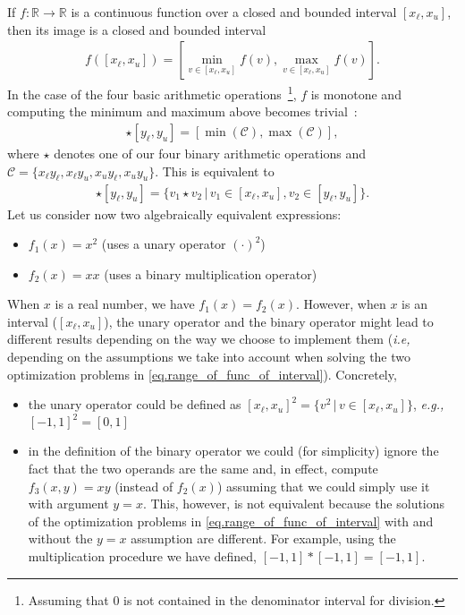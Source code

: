 \documentclass[12pt,a4paper]{article}
\begin{document}
If $f: \mathbb{R} \to \mathbb{R}$ is a continuous function over a closed and bounded
interval $[x_{\ell}, x_u]$, then its image is a closed and bounded interval
\begin{align} \label{eq.range_of_func_of_interval}
  f([x_{\ell}, x_u]) = \left[\min_{v\in[x_{\ell}, x_u]}f(v), \max_{v\in[x_{\ell}, x_u]}f(v)\right].
\end{align}
In the case of the four basic arithmetic operations~\footnote{Assuming that 0 is not
contained in the denominator interval for division.}, $f$ is monotone and computing the
minimum and maximum above becomes trivial~\cite{interval-operators}:
\begin{align*}
  [x_{\ell}, x_u] \star [y_{\ell}, y_u] = [\min(\mathcal{C}), \max(\mathcal{C})],
\end{align*}
where $\star$ denotes one of our four binary arithmetic operations and $\mathcal{C} =
\{x_{\ell}y_{\ell}, x_{\ell}y_{u}, x_{u}y_{\ell}, x_{u}y_{u}\}$. This is equivalent to
\begin{align*}
  [x_{\ell}, x_u] \star [y_{\ell}, y_u] = \{v_1 \star v_2 \, | \, v_1 \in [x_{\ell}, x_u], v_2 \in [y_{\ell}, y_u]\}.
\end{align*}
Let us consider now two algebraically equivalent expressions:
\begin{itemize}
\item $f_1(x) = x^2$ (uses a unary operator $(\cdot)^2$)
\item $f_2(x) = xx$ (uses a binary multiplication operator)
\end{itemize}
When $x$ is a real number, we have $f_1(x) = f_2(x)$. However, when $x$ is an interval
($[x_{\ell}, x_u]$), the unary operator and the binary operator might lead to different
results depending on the way we choose to implement them (\emph{i.e,} depending on the
assumptions we take into account when solving the two optimization problems in
\eqref{eq.range_of_func_of_interval}). Concretely,
\begin{itemize}
\item the unary operator could be defined as $[x_{\ell}, x_u]^2 = \{v^2 \, | \,
  v\in[x_{\ell}, x_u]\}$, \emph{e.g.,} $[-1, 1]^2 = [0, 1]$
\item in the definition of the binary operator we could (for simplicity) ignore the fact
  that the two operands are the same and, in effect, compute $f_3(x, y) = xy$ (instead
  of $f_2(x)$) assuming that we could simply use it with argument $y = x$. This,
  however, is not equivalent because the solutions of the optimization problems in
  \eqref{eq.range_of_func_of_interval} with and without the $y=x$ assumption are
  different. For example, using the multiplication procedure we have defined, $[-1, 1] *
  [-1, 1] = [-1, 1]$.
\end{itemize}
\end{document}
